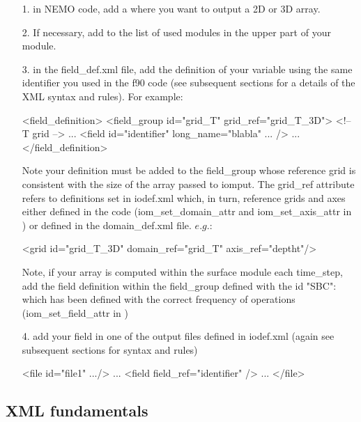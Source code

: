\documentclass[../tex_main/NEMO_manual]{subfiles}
\begin{document}
\begin{enumerate}
	\item[1.] in NEMO code, add a  where you want to 
					output a 2D or 3D array.
	\item[2.] If necessary, add  to the list of used modules in 
					the upper part of your module.
	\item[3.] in the field\_def.xml file, add the definition of your variable using 
					the same identifier you used in the f90 code (see subsequent sections for 
					a details of the XML syntax and rules).
For example:

\begin{xmllines}
<field_definition>
	<field_group id="grid_T" grid_ref="grid_T_3D"> <!-- T grid -->
	...
		<field id="identifier" long_name="blabla" ... />   
		...
</field_definition> 
\end{xmllines}

Note your definition must be added to the field\_group whose reference grid is consistent with 
the size of the array passed to iomput.
The grid\_ref attribute refers to definitions set in iodef.xml which, in turn, reference grids and 
axes either defined in the code (iom\_set\_domain\_attr and iom\_set\_axis\_attr in ) or 
defined in the domain\_def.xml file.
$e.g.$:

\begin{xmllines}
<grid id="grid_T_3D" domain_ref="grid_T" axis_ref="deptht"/>
\end{xmllines}

Note, if your array is computed within the surface module each  time\_step, 
add the field definition within the field\_group defined with the id "SBC":
 which has been defined with the correct frequency of 
operations (iom\_set\_field\_attr in )
	\item[4.] add your field in one of the output files defined in iodef.xml 
(again see subsequent sections for syntax and rules)

\begin{xmllines}
<file id="file1" .../>   
...
	<field field_ref="identifier" />   
	...
</file>   
\end{xmllines}

\end{enumerate}

\subsection{XML fundamentals}
\end{document}
